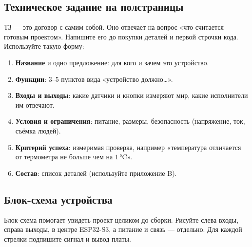\subsection{Техническое задание на полстраницы}

ТЗ --- это договор с самим собой. Оно отвечает на вопрос «что считается готовым проектом». Напишите его
до покупки деталей и первой строчки кода. Используйте такую форму:

\begin{enumerate}
  \item \textbf{Название} и одно предложение: для кого и зачем это устройство.
  \item \textbf{Функции}: 3--5 пунктов вида «устройство должно\ldots».
  \item \textbf{Входы и выходы}: какие датчики и кнопки измеряют мир, какие исполнители им отвечают.
  \item \textbf{Условия и ограничения}: питание, размеры, безопасность (напряжение, ток, съёмка людей).
  \item \textbf{Критерий успеха}: измеримая проверка, например «температура отличается от термометра не больше чем на $1\,$°C».
  \item \textbf{Состав}: список деталей (используйте приложение B).
\end{enumerate}

\subsection{Блок-схема устройства}

Блок-схема помогает увидеть проект целиком до сборки. Рисуйте слева входы, справа выходы, в центре ESP32-S3,
а питание и связь --- отдельно. Для каждой стрелки подпишите сигнал и вывод платы.

